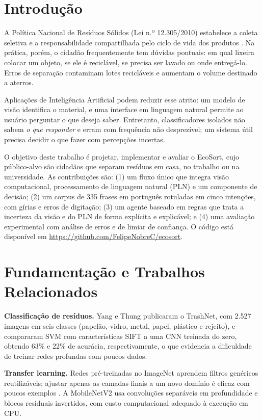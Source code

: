 \documentclass[conference]{IEEEtran}
\begin{document}
\section{Introdução}
A Política Nacional de Resíduos Sólidos (Lei n.º 12.305/2010) estabelece a coleta seletiva e a responsabilidade compartilhada pelo ciclo de vida dos produtos \cite{pnrs}. Na prática, porém, o cidadão frequentemente tem dúvidas pontuais: em qual lixeira colocar um objeto, se ele é reciclável, se precisa ser lavado ou onde entregá-lo. Erros de separação contaminam lotes recicláveis e aumentam o volume destinado a aterros.

Aplicações de Inteligência Artificial podem reduzir esse atrito: um modelo de visão identifica o material, e uma interface em linguagem natural permite ao usuário perguntar o que deseja saber. Entretanto, classificadores isolados não sabem \emph{o que responder} e erram com frequência não desprezível; um sistema útil precisa decidir o que fazer com percepções incertas.

O objetivo deste trabalho é projetar, implementar e avaliar o EcoSort, cujo público-alvo são cidadãos que separam resíduos em casa, no trabalho ou na universidade. As contribuições são: (1) um fluxo único que integra visão computacional, processamento de linguagem natural (PLN) e um componente de decisão; (2) um corpus de 335 frases em português rotuladas em cinco intenções, com gírias e erros de digitação; (3) um agente baseado em regras que trata a incerteza da visão e do PLN de forma explícita e explicável; e (4) uma avaliação experimental com análise de erros e de limiar de confiança. O código está disponível em \url{https://github.com/FelipeNobreC/ecosort}.

\section{Fundamentação e Trabalhos Relacionados}
\textbf{Classificação de resíduos.} Yang e Thung \cite{trashnet} publicaram o TrashNet, com 2.527 imagens em seis classes (papelão, vidro, metal, papel, plástico e rejeito), e compararam SVM com características SIFT a uma CNN treinada do zero, obtendo 63\% e 22\% de acurácia, respectivamente, o que evidencia a dificuldade de treinar redes profundas com poucos dados.

\textbf{Transfer learning.} Redes pré-treinadas no ImageNet \cite{imagenet} aprendem filtros genéricos reutilizáveis; ajustar apenas as camadas finais a um novo domínio é eficaz com poucos exemplos \cite{yosinski}. A MobileNetV2 \cite{mobilenetv2} usa convoluções separáveis em profundidade e blocos residuais invertidos, com custo computacional adequado à execução em CPU.
\end{document}
